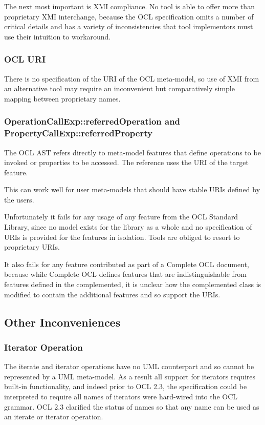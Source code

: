 \documentclass{eceasst}
\begin{document}
The next most important is XMI compliance. No tool is able to offer more than proprietary XMI interchange, because the OCL specification omits a number of critical details and has a variety of  inconsistencies that tool implementors must use their intuition to workaround.
 
\subsubsection{OCL URI}

There is no specification of the URI of the OCL meta-model, so use of XMI from an alternative tool may require an inconvenient but comparatively simple mapping between proprietary names.

\subsubsection{OperationCallExp::referredOperation and PropertyCallExp::referredProperty}

The OCL AST refers directly to meta-model features that define operations to be invoked or properties to be accessed. The reference uses the URI of the target feature.

This can work well for user meta-models that should have stable URIs defined by the users.

Unfortunately it fails for any usage of any feature from the OCL Standard Library, since no model exists for the library as a whole and no specification of URIs is provided for the features in isolation. Tools are obliged to resort to proprietary URIs.

It also fails for any feature contributed as part of a Complete OCL document, because while Complete OCL defines features that are indistinguishable from features defined in the complemented, it is unclear how the complemented class is modified to contain the additional features and so support the URIs.

\subsection{Other Inconveniences}

\subsubsection{Iterator Operation}

The iterate and iterator operations have no UML counterpart and so cannot be represented by a UML meta-model. As a result all support for iterators requires built-in functionality, and indeed prior to OCL 2.3, the specification could be interpreted to require all names of iterators were hard-wired into the OCL grammar. OCL 2.3 clarified the status of names so that any name can be used as an iterate or iterator operation.
\end{document}
